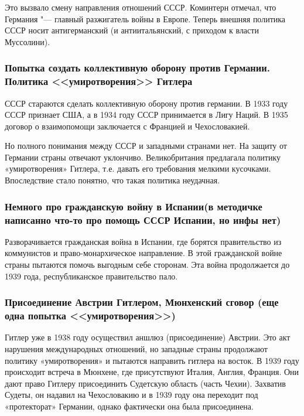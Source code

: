 Это вызвало смену направления отношений СССР. Коминтерн отмечал, что Германия "--- главный разжигатель войны в Европе. Теперь внешняя политика СССР носит антигерманский (и антиитальянский, с приходом к власти Муссолини). 

\subsubsection{\textbf{Попытка создать коллективную оборону против Германии. Политика <<умиротворения>> Гитлера}}

СССР стараются сделать коллективную оборону против германии. В 1933 году СССР признает США, а в 1934 году СССР принимается в Лигу Наций. В 1935 договор о взаимопомощи заключается с Францией и Чехословакией.

Но полного понимания между СССР и западными странами нет. На защиту от Германии страны отвечают уклончиво. Великобритания предлагала политику «умиротворения» Гитлера, т.е. давать его требования мелкими кусочками. Впоследствие стало понятно, что такая политика неудачная. 

\subsubsection{\textbf{Немного про гражданскую войну в Испании(в методичке написанно что-то про помощь СССР Испании, но инфы нет)}}

Разворачивается гражданская война в Испании, где борятся правительство из коммунистов и право-монархическое направление. В этой гражданской войне страны пытаются помочь выгодным себе сторонам. Эта война продолжается до 1939 года, республиканское правительство пало.

\subsubsection{\textbf{Присоединение Австрии Гитлером, Мюнхенский сговор (еще одна попытка <<умиротворения>>)}}

Гитлер уже в 1938 году осуществил аншлюз (присоединение) Австрии. Это акт нарушения международных отношений, но западные страны продолжают политику «умиротворения» и пытаются направить гитлера на восток. В 1939 году происходит встреча в Мюнхене, где присутствуют Италия, Англия, Франция. Они дают право Гитлеру присоединить Судетскую область (часть Чехии). Захватив Судеты, он надавил на Чехословакию и в 1939 году она переходит под «протекторат» Германии, однако фактически она была присоединена.

